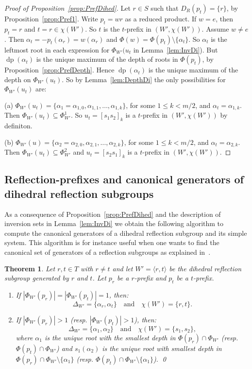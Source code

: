 \documentclass{amsart}
\newtheorem{Theorem}{Theorem}[section]
\theoremstyle{definition}
\newcommand{\dep}{\operatorname{dp}}
\begin{document}
\begin{proof}[Proof of Proposition~\ref{prop:PrefDihed}] Let $r\in S$ such that $D_R(p_t)=\{r\}$, by Proposition~\ref{prop:Pref1}. Write $p_t=wr$ as a reduced product. If $w=e$, then $p_t=r$ and $t=r\in\chi(W')$. So $t$ is the $t$-prefix in $(W',\chi(W'))$. Assume  $w\not = e$. Then $\alpha_t=-p_t(\alpha_r)=w(\alpha_r)$ and $\Phi(w)=\Phi(p_t)\setminus\{\alpha_t\}$. So $\alpha_t$ is the leftmost root in each expression for $\Phi_{W'}(u_t$ in Lemma~\ref{lem:InvDi}). But $\dep(\alpha_t)$ is the unique maximum of the depth of roots in $\Phi(p_t)$, by Proposition~\ref{prop:PrefDepth}. Hence  $\dep(\alpha_t)$ is the unique maximum of the depth on $\Phi_{W'}(u_t)$. So by Lemma~\ref{lem:DepthDi} the only possibilities for $\Phi_{W'}(u_t)$ are:

\noindent (a) $\Phi_{W'}(u_t)=\{\alpha_1=\alpha_{1,0},\alpha_{1,1}, \dots , \alpha_{1,k} \}$, for some $1\leq k< m/2$, and $\alpha_t=\alpha_{1,k}$. Then $\Phi_{W'}(u_t)\subseteq \Phi_{W'}^1$. So  $u_{t}=[s_1 s_2]_{k}$ is a $t$-prefix in $(W',\chi(W'))$ by definiton.

\noindent (b) $\Phi_{W'}(u)=\{\alpha_2=\alpha_{2,0},\alpha_{2,1}, \dots , \alpha_{2,k} \}$, for some $1\leq k< m/2$,  and $\alpha_t=\alpha_{2,k}$. Then  $\Phi_{W'}(u_t)\subseteq \Phi_{W'}^2$ and $u_{t}=[s_2 s_1]_{k}$ is a $t$-prefix in $(W',\chi(W'))$. 
\end{proof}


\subsection{Reflection-prefixes and canonical generators of dihedral reflection subgroups}\label{ss:Algo}

As a consequence of Proposition~\ref{prop:PrefDihed} and the description of inversion sets in Lemma~\ref{lem:InvDi} we obtain the following   algorithm to compute the canonical generators of a dihedral reflection subgroup and its simple system. This algorithm is for instance useful when one wants to find the canonical set of generators of a reflection subgroups as explained in~\cite[Proposition~3.7]{Dy90}.


\begin{Theorem}\label{prop:algo} Let $r,t\in T$ with $r\not = t$ and let $W'=\langle r,t\rangle$ be the dihedral reflection subgroup generated by $r$ and $t$. Let $p_r$ be a $r$-prefix and $p_t$ be a $t$-prefix.
\begin{enumerate}
\item If $|\Phi_{W'}(p_r)|=|\Phi_{W'}(p_t)|=1$, then:
$$
\Delta_{W'}=\{\alpha_r,\alpha_t\}\quad\textrm{and}\quad\chi(W')=\{r,t\}.
$$
\item If   $|\Phi_{W'}(p_r)|>1$ (resp. $|\Phi_{W'}(p_t)|>1$), then:
 $$
 \Delta_{W'}=\{\alpha_1,\alpha_2\}\quad\textrm{and}\quad\chi(W')=\{s_1,s_2\},
 $$
 where $\alpha_1$ is the unique root with the smallest depth in $\Phi(p_r)\cap \Phi_{W'}$ (resp. $\Phi(p_t)\cap \Phi_{W'}$) and $s_1(\alpha_2)$ is the unique root with smallest depth in $\Phi(p_r)\cap \Phi_{W'}\setminus\{\alpha_1\}$ (resp. $\Phi(p_t)\cap \Phi_{W'}\setminus\{\alpha_1\}$). \qed
\end{enumerate}
 \end{Theorem}
\end{document}
